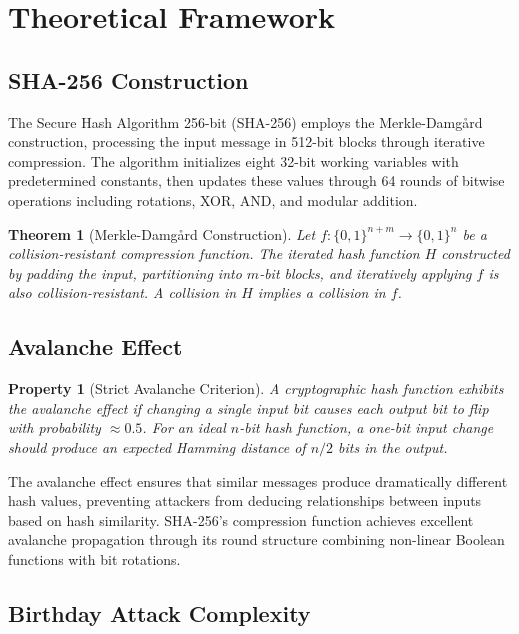 \documentclass[a4paper, 11pt]{article}
\newtheorem{theorem}{Theorem}[section]
\newtheorem{property}{Property}[section]
\begin{document}
\section{Theoretical Framework}

\subsection{SHA-256 Construction}

The Secure Hash Algorithm 256-bit (SHA-256) employs the Merkle-Damg\r{a}rd construction,
processing the input message in 512-bit blocks through iterative compression. The algorithm
initializes eight 32-bit working variables with predetermined constants, then updates these
values through 64 rounds of bitwise operations including rotations, XOR, AND, and modular addition.

\begin{theorem}[Merkle-Damg\r{a}rd Construction]
Let $f: \{0,1\}^{n+m} \rightarrow \{0,1\}^n$ be a collision-resistant compression function.
The iterated hash function $H$ constructed by padding the input, partitioning into $m$-bit
blocks, and iteratively applying $f$ is also collision-resistant. A collision in $H$ implies
a collision in $f$.
\end{theorem}

\subsection{Avalanche Effect}

\begin{property}[Strict Avalanche Criterion]
A cryptographic hash function exhibits the avalanche effect if changing a single input bit
causes each output bit to flip with probability $\approx 0.5$. For an ideal $n$-bit hash
function, a one-bit input change should produce an expected Hamming distance of $n/2$ bits
in the output.
\end{property}

The avalanche effect ensures that similar messages produce dramatically different hash values,
preventing attackers from deducing relationships between inputs based on hash similarity.
SHA-256's compression function achieves excellent avalanche propagation through its round
structure combining non-linear Boolean functions with bit rotations.

\subsection{Birthday Attack Complexity}
\end{document}

